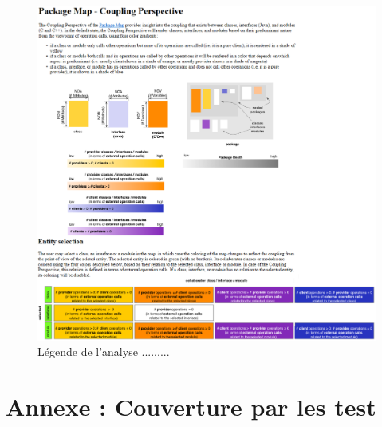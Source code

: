 \documentclass[12pt,a4paper,final]{article}
\begin{document}
\begin{figure}[ht]
	\centering
	\includegraphics[width=\textwidth]{images/InCodeCouplingLegende.png}
	\caption{\label{incodeCouplLeg}Légende de l'analyse .........}
\end{figure}




\clearpage
\newpage
\section{Annexe : Couverture par les test}\label{coverage}
\end{document}
